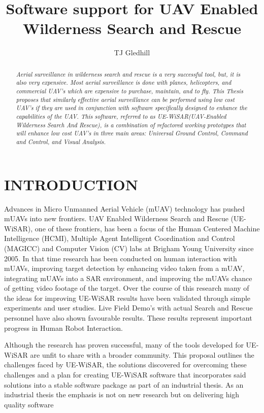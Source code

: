 \documentclass[12pt]{IEEEtran}
\title{Software support for UAV Enabled Wilderness Search and Rescue}
\author{TJ Gledhill}
\begin{document}
\maketitle

\begin{abstract}
\textit{Aerial surveillance in wilderness search and rescue is a very successful
tool, but, it is also very expensive.
Most aerial surveillance is done with planes, helicopters, and commercial UAV’s which are expensive to purchase, maintain, and to fly.  
This Thesis proposes that similarly effective aerial surveillance can be
performed using low cost UAV’s if they are used in conjunction with software specifically designed to enhance the capabilities of the UAV.
This software, referred to as UE-WiSAR(UAV-Enabled Wilderness Search And
Rescue), is a combination of refactored working prototypes that will
enhance low cost UAV’s in three main areas:
Universal Ground Control, Command and Control, and Visual Analysis.}
\end{abstract}

\section{INTRODUCTION}
Advances in Micro Unmanned Aerial Vehicle (mUAV) technology has pushed mUAVs
into new frontiers.  UAV Enabled Wilderness Search and
Rescue (UE-WiSAR), one of these frontiers, has been a focus of the Human
Centered Machine Intelligence (HCMI), Multiple Agent Intelligent Coordination and Control (MAGICC) and Computer Vision (CV) labs at Brigham Young University since 2005.  In that time research has
been conducted on human interaction with mUAVs, improving target detection by
enhancing video taken from a mUAV, integrating mUAVs into a SAR environment,
and improving the mUAVs chance of getting video footage of the target.  Over
the course of this research many of the ideas for improving UE-WiSAR results
have been validated through simple experiments and user studies.  Live Field
Demo's with actual Search and Rescue personnel have also shown favourable
results. These results represent important progress in Human Robot Interaction. 

Although the research has proven successful, many of the tools developed for
UE-WiSAR are unfit to share with a broader community.  This proposal outlines
the challenges faced by UE-WiSAR, the solutions discovered for overcoming these
challenges and a plan for creating UE-WiSAR software that incorporates said
solutions into a stable software package as part of an industrial thesis.  As an
industrial thesis the emphasis is not on new research but on delivering high
quality software
\end{document}
